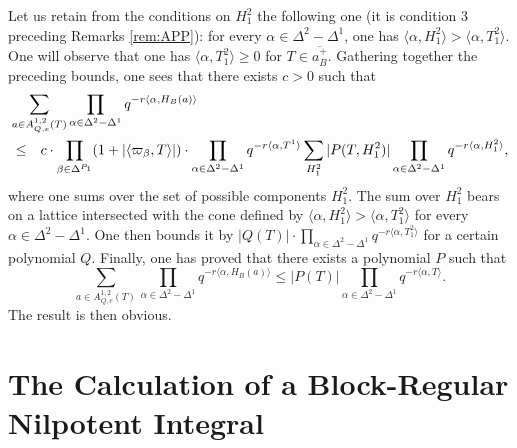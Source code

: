 \begin{paragr}
Let us retain from the conditions on $H_1^2$ the following one (it is condition 3 preceding Remarks \ref{rem:APP}): for every $\alpha\in \Delta^2-\Delta^1$, one has $\langle \alpha,H_1^2\rangle > \langle \alpha,T_1^2\rangle$. One will observe that one has $\langle \alpha,T_1^2\rangle \geq 0$ for $T\in \overline{a_B^+}$. Gathering together the preceding bounds, one sees that there exists $c>0$ such that
\begin{eqnarray*}
  \lefteqn{\sum_{a\in A^{1,2}_{Q,e}(T)} \prod_{\alpha\in \Delta^2-\Delta^1} q^{-r\langle \alpha,H_B(a)\rangle}}\\
  &\leq& c\cdot \prod_{\beta\in \Delta^{P_1}} (1+|\langle \varpi_\beta,T\rangle|)\cdot \prod_{\alpha\in \Delta^2-\Delta^1} q^{-r\langle \alpha,T^1\rangle} \sum_{H_1^2} |P(T,H_1^2)| \prod_{\alpha\in \Delta^2-\Delta^1} q^{-r\langle \alpha,H_1^2\rangle},
\end{eqnarray*}
where one sums over the set of possible components $H_1^2$. The sum over $H_1^2$ bears on a lattice intersected with the cone defined by $\langle \alpha,H_1^2\rangle > \langle \alpha,T_1^2\rangle$ for every $\alpha\in \Delta^2-\Delta^1$. One then bounds it by $|Q(T)|\cdot \prod_{\alpha\in \Delta^2-\Delta^1} q^{-r\langle \alpha,T_1^2\rangle}$ for a certain polynomial $Q$. Finally, one has proved that there exists a polynomial $P$ such that
$$\sum_{a\in A^{1,2}_{Q,e}(T)} \prod_{\alpha\in \Delta^2-\Delta^1} q^{-r\langle \alpha,H_B(a)\rangle}\leq |P(T)| \prod_{\alpha\in \Delta^2-\Delta^1} q^{-r\langle \alpha,T\rangle}.$$
The result is then obvious.
\end{paragr}

\section{\texorpdfstring{The Calculation of a \og Block-Regular\fg{} Nilpotent Integral}{The Calculation of a ``Block-Regular'' Nilpotent Integral}}\label{sec:reg-blocs}

